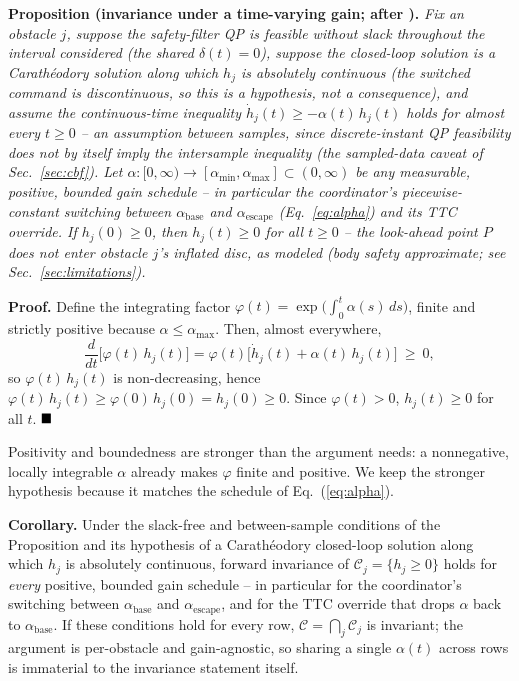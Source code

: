 \documentclass[journal]{IEEEtran}
\begin{document}
\noindent\textbf{Proposition (invariance under a time-varying gain; after
\cite{ada_cbf}).}
\textit{Fix an obstacle $j$, suppose the safety-filter QP is feasible
without slack throughout the interval considered (the shared
$\delta(t)=0$), suppose the closed-loop solution is a Carath\'eodory solution along which
$h_j$ is absolutely continuous (the switched command is discontinuous,
so this is a hypothesis, not a consequence), and assume the continuous-time inequality
$\dot h_j(t) \ge -\alpha(t)\,h_j(t)$ holds for almost every $t\ge0$ --
an assumption between samples, since discrete-instant QP feasibility does
not by itself imply the intersample inequality (the sampled-data caveat of
Sec.~\ref{sec:cbf}). Let $\alpha:[0,\infty)\to[\alpha_{\min},\alpha_{\max}]
\subset(0,\infty)$ be \emph{any} measurable, positive, bounded gain
schedule -- in particular the coordinator's piecewise-constant switching
between $\alpha_\text{base}$ and $\alpha_\text{escape}$ (Eq.~\ref{eq:alpha})
and its TTC override. If $h_j(0)\ge0$, then
$h_j(t)\ge0$ for all $t\ge0$ -- the look-ahead point $P$ does not enter
obstacle $j$'s inflated disc, as modeled (body safety approximate; see
Sec.~\ref{sec:limitations}).}

\noindent\textbf{Proof.} Define the integrating factor
$\varphi(t)=\exp\!\big(\int_0^t \alpha(s)\,ds\big)$, finite and strictly
positive because $\alpha\le\alpha_{\max}$. Then, almost everywhere,
\begin{equation}
\frac{d}{dt}\big[\varphi(t)\,h_j(t)\big]
= \varphi(t)\big[\dot h_j(t)+\alpha(t)\,h_j(t)\big] \ \ge\ 0,
\end{equation}
so $\varphi(t)\,h_j(t)$ is non-decreasing, hence
$\varphi(t)\,h_j(t)\ge\varphi(0)\,h_j(0)=h_j(0)\ge0$. Since
$\varphi(t)>0$, $h_j(t)\ge0$ for all $t$. $\hfill\blacksquare$

Positivity and boundedness are stronger than the argument needs: a
nonnegative, locally integrable $\alpha$ already makes $\varphi$ finite
and positive. We keep the stronger hypothesis because it matches the
schedule of Eq.~(\ref{eq:alpha}).

\noindent\textbf{Corollary.} Under the slack-free and between-sample conditions of the Proposition
and its hypothesis of a Carath\'eodory closed-loop solution along which $h_j$
is absolutely continuous, forward invariance of
$\mathcal{C}_j=\{h_j\ge0\}$ holds for \emph{every} positive, bounded gain
schedule -- in particular for the coordinator's switching between
$\alpha_\text{base}$ and $\alpha_\text{escape}$, and for the TTC override
that drops $\alpha$ back to $\alpha_\text{base}$. If these conditions hold
for every row, $\mathcal{C}=\bigcap_j\mathcal{C}_j$ is invariant; the
argument is per-obstacle and gain-agnostic, so sharing a single
$\alpha(t)$ across rows is immaterial to the invariance statement itself.
\end{document}

